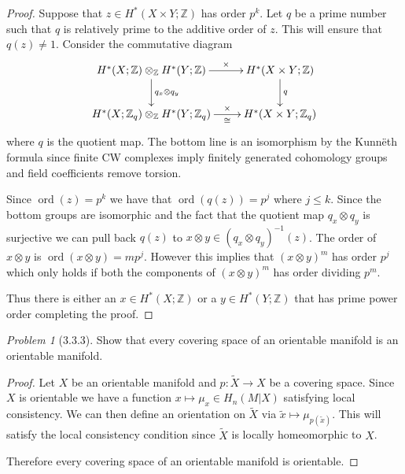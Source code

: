 \documentclass[10pt]{article}
\newcommand{\sk}{\vskip 10mm}
\newcommand{\bb}[1]{\mathbb{#1}}
\newcommand{\wt}[1]{\widetilde{#1}}
\DeclareMathOperator{\ord}{ord}
\theoremstyle{remark}
\newtheorem{problem}{Problem}
\begin{document}
\begin{proof}
  Suppose that $z\in H^*(X\times Y;\bb{Z})$ has order $p^k$. Let $q$ be a prime number
  such that $q$ is relatively prime to the additive order of $z$. This will
  ensure that $q(z)\neq 1$. Consider the commutative diagram
  \[
    \xymatrix{
      H^*(X;\bb{Z})\otimes_{\bb{Z}} H^*(Y;\bb{Z}) \ar[r]^-\times \ar[d]^{q_x\otimes q_y}& H^*(X\times Y;\bb{Z}) \ar[d]^{ q}\\
      H^*(X;\bb{Z}_q)\otimes_{\bb{Z}} H^*(Y;\bb{Z}_q) \ar[r]^-\times_-\cong & H^*(X\times Y;\bb{Z}_q)\\
    }
  \]
  where $q$ is the quotient map. The bottom line is an isomorphism by the
  Kunn\"eth formula since finite CW complexes imply finitely generated cohomology
  groups and field coefficients remove torsion.

  Since $\ord(z)=p^k$ we have that $\ord(q(z))=p^j$ where $j\leq k$. Since the bottom
  groups are isomorphic and the fact that the quotient map $q_x\otimes q_y$ is surjective
  we can pull back $q(z)$ to $x\otimes y\in(q_x\otimes q_y)^{-1}(z)$. The order of $x\otimes y$ is
  $\ord(x\otimes y)=m p^j$. However this implies that $(x\otimes y)^m$ has order $p^j$ which
  only holds if both the components of $(x\otimes y)^m$ has order dividing $p^m$.

  Thus there is either an $x\in H^*(X;\bb{Z})$ or a $y\in H^*(Y;\bb{Z})$ that has
  prime power order completing the proof.
\end{proof}

\sk

\begin{problem}[3.3.3]
  Show that every covering space of an orientable manifold is an orientable
  manifold.
\end{problem} 

\begin{proof}
  Let $X$ be an orientable manifold and $p:\wt{X}\rightarrow X$ be a covering space.
  Since $X$ is orientable we have a function $x\mapsto \mu_x\in H_n(M|X)$ satisfying
  local consistency. We can then define an orientation on $\wt{X}$ via
  $\wt{x}\mapsto \mu_{p(\wt{x})}$. This will satisfy the local consistency condition
  since $\wt{X}$ is locally homeomorphic to $X$.

  Therefore every covering space of an orientable manifold is orientable.
\end{proof}
\end{document}
